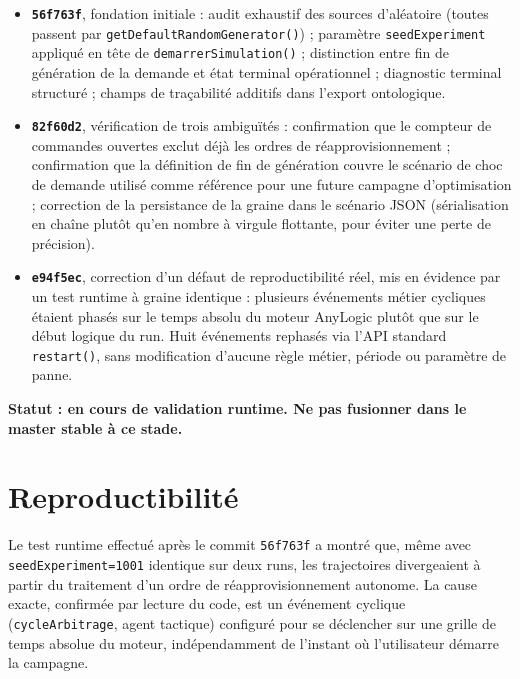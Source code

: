\documentclass[11pt,a4paper]{article}
\newcommand{\code}[1]{\texttt{#1}}
\begin{document}
\begin{itemize}
  \item \textbf{\code{56f763f}}, fondation initiale : audit exhaustif des
        sources d'aléatoire (toutes passent par
        \code{getDefault\allowbreak RandomGenerator()}) ; paramètre
        \code{seedExperiment} appliqué en tête de \code{demarrer\allowbreak Simulation()} ;
        distinction entre fin de génération de la demande et état terminal
        opérationnel ; diagnostic terminal structuré ; champs de
        traçabilité additifs dans l'export ontologique.
  \item \textbf{\code{82f60d2}}, vérification de trois ambiguïtés :
        confirmation que le compteur de commandes ouvertes exclut déjà les
        ordres de réapprovisionnement ; confirmation que la définition de
        fin de génération couvre le scénario de choc de demande utilisé
        comme référence pour une future campagne d'optimisation ;
        correction de la persistance de la graine dans le scénario JSON
        (sérialisation en chaîne plutôt qu'en nombre à virgule flottante,
        pour éviter une perte de précision).
  \item \textbf{\code{e94f5ec}}, correction d'un défaut de
        reproductibilité réel, mis en évidence par un test runtime à
        graine identique : plusieurs événements métier cycliques étaient
        phasés sur le temps absolu du moteur AnyLogic plutôt que sur le
        début logique du run. Huit événements rephasés via l'API standard
        \code{restart()}, sans modification d'aucune règle métier, période
        ou paramètre de panne.
\end{itemize}

\textbf{Statut : en cours de validation runtime. Ne pas fusionner dans le
master stable à ce stade.}

\section{Reproductibilité}

Le test runtime effectué après le commit \code{56f763f} a montré que,
même avec \code{seedExperiment=1001} identique sur deux runs, les
trajectoires divergeaient à partir du traitement d'un ordre de
réapprovisionnement autonome. La cause exacte, confirmée par lecture du
code, est un événement cyclique (\code{cycleArbitrage}, agent tactique)
configuré pour se déclencher sur une grille de temps absolue du moteur,
indépendamment de l'instant où l'utilisateur démarre la campagne.
\end{document}
